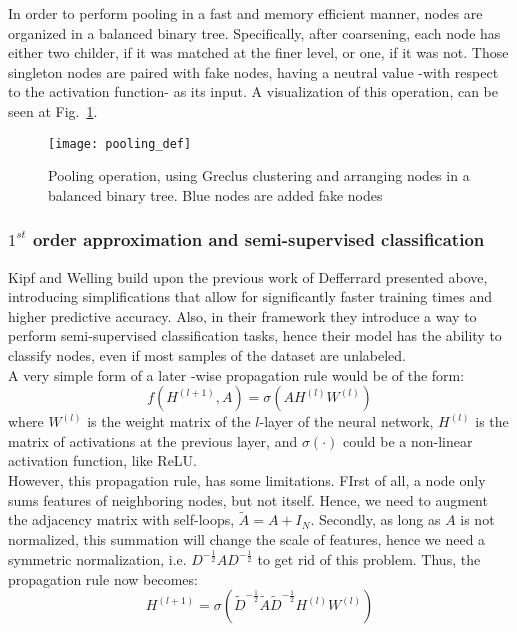 In order to perform pooling in a fast and memory efficient manner, nodes are
organized in a balanced binary tree. Specifically, after coarsening, each node
has either two childer, if it was matched at the finer level, or one, if it was
not. Those singleton nodes are paired with fake nodes, having a neutral value
-with respect to the activation function- as its input. A visualization of this
operation, can be seen at Fig.~\ref{pooldef}.
\begin{figure}
\texttt{[image: pooling\_def]}
\caption{Pooling operation, using Greclus clustering and arranging nodes in a
balanced binary tree. Blue nodes are added fake nodes}
\label{pooldef}
\end{figure}
\subsubsection*{$1^{st}$ order approximation and semi-supervised classification}
Kipf and Welling \cite{kipf} build upon the previous work of Defferrard
presented above, introducing simplifications that allow for significantly faster training
times and higher predictive accuracy. Also, in their framework they introduce a
way to perform semi-supervised classification tasks, hence their model has the
ability to classify nodes, even if most samples of the dataset are unlabeled.\\
A very simple form of a later -wise propagation rule would be of the form:
\begin{equation*}
f(H^{(l+1)},A) = \sigma(AH^{(l)}W^{(l)})
\end{equation*}
where $W^{(l)}$ is the weight matrix of the $l$-layer of the neural network,
$H^{(l)}$ is the matrix of activations at the previous layer, and $\sigma(\cdot
)$ could be  a non-linear activation function, like ReLU.\\
However, this propagation rule, has some limitations. FIrst of all, a node only
sums features of neighboring nodes, but not itself. Hence, we need to augment
the adjacency matrix with self-loops, $\widetilde{A} = A + I_N$. Secondly, as
long as $A$ is not normalized, this summation will change the scale of features,
hence we need a symmetric normalization, i.e.
$D^{-\frac{1}{2}}AD^{-\frac{1}{2}}$ to get rid of this problem. Thus, the
propagation rule now becomes:\\
\begin{equation}
H^{(l+1)} =
\sigma(\widetilde{D}^{-\frac{1}{2}}\widetilde{A}\widetilde{D}^{-\frac{1}{2}}H^{(l)}W^{(l)})
\end{equation}
